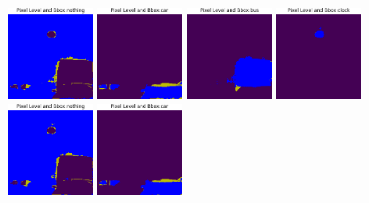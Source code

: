 \begin{figure}[h!]
  \newline
  \includegraphics[width=0.2\textwidth]{../../modelos-entrenados/unet-nonlocal/ejecucion7/predvalmid0}
  \vrule
  \includegraphics[width=0.2\textwidth]{../../modelos-entrenados/unet-nonlocal/ejecucion7/predvalmid3}
  \vrule
  \includegraphics[width=0.2\textwidth]{../../modelos-entrenados/unet-nonlocal/ejecucion7/predvalmid6}
  \vrule
  \includegraphics[width=0.2\textwidth]{../../modelos-entrenados/unet-nonlocal/ejecucion7/predvalmid85}
  \vrule
  \includegraphics[width=0.2\textwidth]{../../modelos-entrenados/unet-nonlocal/ejecucion8/predvalmid0}
  \vrule
  \includegraphics[width=0.2\textwidth]{../../modelos-entrenados/unet-nonlocal/ejecucion8/predvalmid3}

\end{figure}
